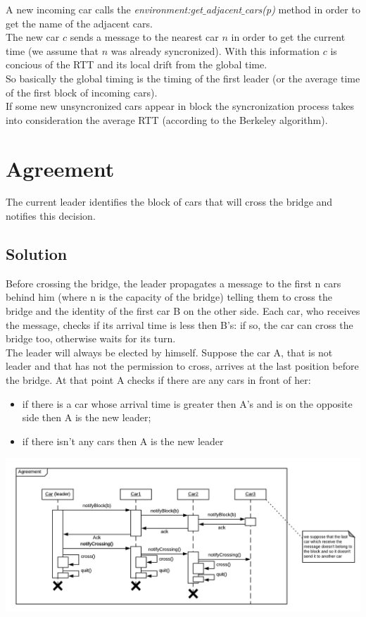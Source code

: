 A new incoming car calls the \textit{environment:get$\_$adjacent$\_$cars(p)} 
method in order to get the name of the adjacent cars. \\

The new car $c$ sends a message to the nearest car $n$ in order to get the current time 
(we assume that $n$ was already syncronized). 
With this information $c$ is concious of the RTT and its local drift from the global time. \\

So basically the global timing is the timing of the first leader (or the average time 
of the first block of incoming cars).\\

If some new unsyncronized cars appear in block the syncronization process takes into 
consideration the average RTT (according to the Berkeley algorithm). 


\section{Agreement}

The current leader identifies the block of cars that will cross the bridge and notifies
this decision.  

\subsection{Solution}

Before crossing the bridge, the leader propagates a message to 
the first n cars behind him (where n is the capacity of the bridge) telling them to cross the bridge
and the identity of the first car B on the other side. Each car, who 
receives the message, checks if its arrival time is less then B's: if so, the car can 
cross the bridge too, otherwise waits for its turn.\\
The leader will always be elected by himself. Suppose the car A, that is not leader
 and that has not the permission to cross, arrives at the last position
before the bridge. At that point A checks if there are any cars in front of her:
\begin{itemize}
\item if there is a car whose arrival time is greater then A's and is on the opposite side
then A is the new leader;
\item if there isn't any cars then A is the new leader 
\end{itemize}

\begin{center}
    \includegraphics[scale=0.6]{assets/ds2019_3.png}
\end{center}


